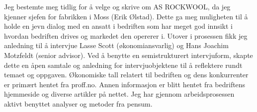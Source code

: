 \indent \newline
Jeg bestemte meg tidlig for å velge og skrive om AS ROCKWOOL, da jeg kjenner sjefen for fabrikken i Moss (Erik Ølstad). Dette ga meg muligheten til å holde en jevn dialog med en ansatt i bedriften som har meget god innsikt i hvordan bedriften drives og markedet den opererer i. Utover i prosessen fikk jeg anledning til å intervjue Lasse Scott (økonomiansvarlig) og Hans Joachim Motzfeldt (senior advisor). Ved å benytte en semistrukturert intervjuform, skapte dette en åpen samtale og anledning for intervjuobjektene til å reflektere rundt temaet og oppgaven. Økonomiske tall relatert til bedriften og dens konkurrenter er primært hentet fra proff.no. Annen informasjon er blitt hentet fra bedriftens hjemmeside og diverse artikler på nettet. Jeg har gjennom arbeidsprosessen aktivt benyttet analyser og metoder fra pensum.
